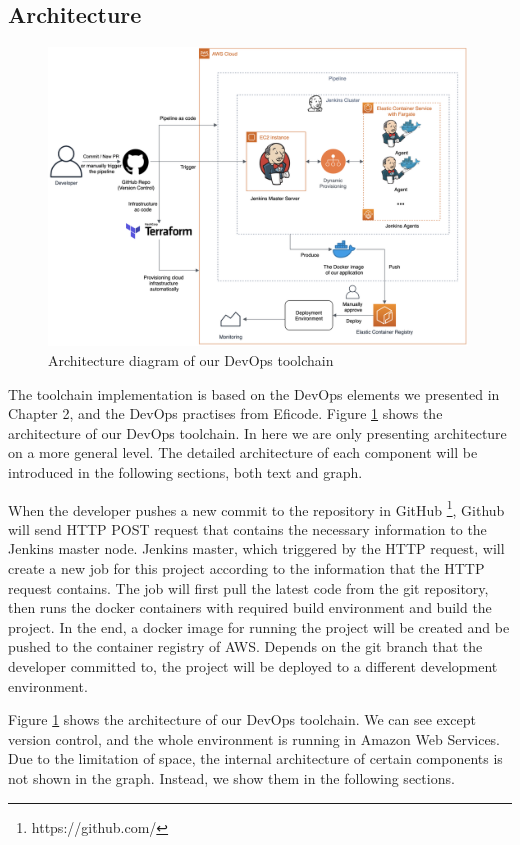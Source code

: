 \subsection{Architecture}
\begin{figure}[!htbp]
\centering
\includegraphics[width=0.99\textwidth]{pics/arch-med-jenkins.png}
\caption{Architecture diagram of our DevOps toolchain}
\label{fig:archjenkins}
\end{figure}
The toolchain implementation is based on the DevOps elements we presented in Chapter 2, and the DevOps practises from Eficode. Figure \ref{fig:archjenkins} shows the architecture of our DevOps toolchain. In here we are only presenting architecture on a more general level. The detailed architecture of each component will be introduced in the following sections, both text and graph.
\par
When the developer pushes a new commit to the repository in GitHub \footnote{https://github.com/}, Github will send HTTP POST request that contains the necessary information to the Jenkins master node. Jenkins master, which triggered by the HTTP request, will create a new job for this project according to the information that the HTTP request contains. The job will first pull the latest code from the git repository, then runs the docker containers with required build environment and build the project. In the end, a docker image for running the project will be created and be pushed to the container registry of AWS. Depends on the git branch that the developer committed to, the project will be deployed to a different development environment.
\par
Figure \ref{fig:archjenkins} shows the architecture of our DevOps toolchain. We can see except version control, and the whole environment is running in Amazon Web Services. Due to the limitation of space, the internal architecture of certain components is not shown in the graph. Instead, we show them in the following sections.
